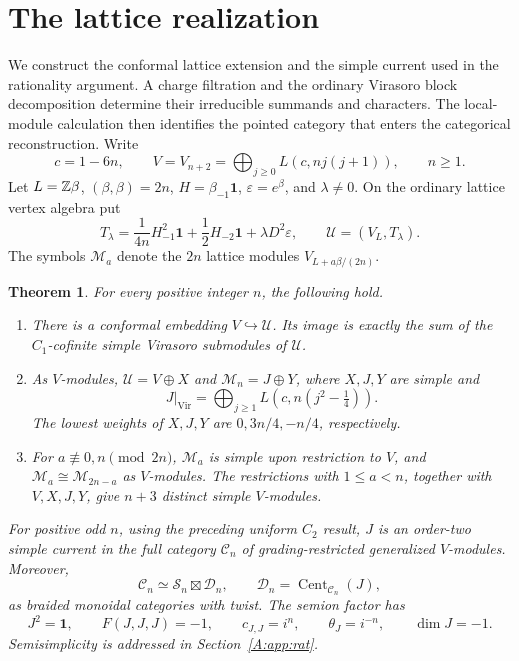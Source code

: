 \documentclass[11pt]{article}
\newtheorem{theorem}{Theorem}[section]
\newcommand{\one}{\mathbf1}\newcommand{\D}{\mathcal D}\newcommand{\Dcat}{\mathcal D}
\newcommand{\Scat}{\mathcal S}\newcommand{\U}{\mathcal U}\newcommand{\bo}{\boxtimes}
\newcommand{\Vir}{\operatorname{Vir}}\newcommand{\Rep}{\operatorname{Rep}}
\numberwithin{equation}{section}
\begin{document}
\section{The lattice realization}\label{A:app:lat}
We construct the conformal lattice extension and the simple current used in the rationality argument. A charge filtration and the ordinary Virasoro block decomposition determine their irreducible summands and characters. The local-module calculation then identifies the pointed category that enters the categorical reconstruction.
Write
\[
 c=1-6n,\qquad V=V_{n+2}=\bigoplus_{j\geq0}L(c,nj(j+1)),\qquad n\geq1.
\]
Let $L=\mathbb Z\beta$, $(\beta,\beta)=2n$, $H=\beta_{-1}\one$, $\varepsilon=e^\beta$, and $\lambda\ne0$. On the ordinary lattice vertex algebra put
\begin{equation}\label{A:lat:stress}
 T_\lambda=\frac{1}{4n}H_{-1}^{2}\one+\frac12H_{-2}\one+\lambda D^2\varepsilon,
 \qquad \U=(V_L,T_\lambda).
\end{equation}
The symbols $\mathcal M_a$ denote the $2n$ lattice modules $V_{L+a\beta/(2n)}$.

\begin{theorem}\label{A:lat:main}
For every positive integer $n$, the following hold.
\begin{enumerate}[label=(\roman*),leftmargin=7mm]
\item There is a conformal embedding $V\hookrightarrow\U$. Its image is exactly the sum of the $C_1$-cofinite simple Virasoro submodules of $\U$.
\item As $V$-modules, $\U=V\oplus X$ and $\mathcal M_n=J\oplus Y$, where $X,J,Y$ are simple and
\[
 J\big|_{\Vir}=\bigoplus_{j\geq1}L\left(c,n\left(j^2-\tfrac14\right)\right).
\]
The lowest weights of $X,J,Y$ are $0,3n/4,-n/4$, respectively.
\item For $a\not\equiv0,n\pmod{2n}$, $\mathcal M_a$ is simple upon restriction to $V$, and $\mathcal M_a\cong \mathcal M_{2n-a}$ as $V$-modules. The restrictions with $1\leq a<n$, together with $V,X,J,Y$, give $n+3$ distinct simple $V$-modules.
\end{enumerate}
For positive odd $n$, using the preceding uniform $C_2$ result, $J$ is an order-two simple current in the full category $\mathcal C_n$ of grading-restricted generalized $V$-modules. Moreover,
\begin{equation}\label{A:lat:factor}
 \mathcal C_n\simeq\Scat_n\boxtimes\Dcat_n,
 \qquad \Dcat_n=\operatorname{Cent}_{\mathcal C_n}(J),
\end{equation}
as braided monoidal categories with twist. The semion factor has
\[
 J^2=\one,\qquad F(J,J,J)=-1,\qquad c_{J,J}=i^n,\qquad
 \theta_J=i^{-n},\qquad \dim J=-1.
\]
Semisimplicity is addressed in Section~\ref{A:app:rat}.
\end{theorem}
\end{document}

